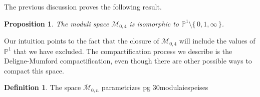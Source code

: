\documentclass[11pt]{article}
\newcommand{\bP}{\mathbb{P}}
\newcommand{\ov}{\overline}        %
\newcommand{\cM}{\mathcal{M}}           %
\newcommand{\set}[1]{\{\,#1\,\}}    %
\newcommand{\less}{\setminus}           %
\newtheorem{Prop}{Proposition}         %
\theoremstyle{definition}
\newtheorem{Def}{Definition}           %
\theoremstyle{remark}
\numberwithin{theorem}{section}
\begin{document}
The previous discussion proves the following result.

\begin{Prop}
    The moduli space $\cM_{0,4}$ is isomorphic to $\bP^1\less\set{0,1,\infty}$.
\end{Prop}

Our intuition points to the fact that the closure of $\cM_{0,4}$ will include the values of $\bP^1$ that we have excluded. The compactification process we describe is the Deligne-Mumford compactification, even though there are other possible ways to compact this space.

\begin{Def}
    The space $\ov{\cM}_{0,n}$ parametrizes pg 30modulaiespeises
\end{Def}



\nocite{*}


\end{document}
